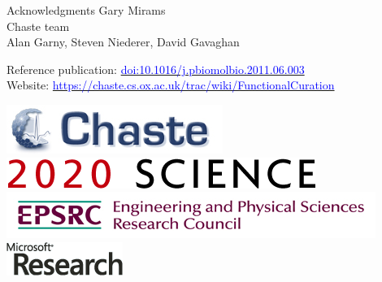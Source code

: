 \documentclass[t,xcolor={usenames,dvipsnames}]{beamer}
\newcommand{\myhref}[2]{\href{#1}{\textcolor{Blue}{#2}}}
\newcommand{\myurl}[1]{\myhref{#1}{#1}}
\newcommand{\doi}[1]{\myhref{http://dx.doi.org/#1}{doi:#1}}
\begin{document}
\begin{frame}{Acknowledgments}
Gary Mirams\\
Chaste team\\
Alan Garny, Steven Niederer, David Gavaghan

Reference publication: \doi{10.1016/j.pbiomolbio.2011.06.003}\\
Website: \myurl{https://chaste.cs.ox.ac.uk/trac/wiki/FunctionalCuration}

\begin{center}
\includegraphics[scale=.9]{chaste-266x60}\\ \vspace{.3cm}
\includegraphics[scale=.7]{logo2020science}\\ \vspace{.4cm}
\includegraphics[width=.55\textwidth]{EPSRC1RGBLO} \hspace{.1cm}
\includegraphics[scale=.55]{logo_msr}
\end{center}
\end{frame}
\end{document}

